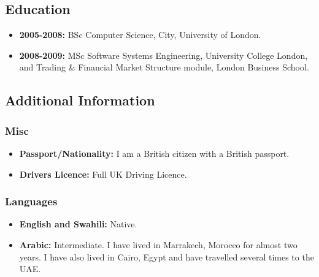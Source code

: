 \documentclass[
  a4paper,
]{article}
\providecommand{\tightlist}{%
  \setlength{\itemsep}{0pt}\setlength{\parskip}{0pt}}
\begin{document}
\hypertarget{education}{%
\subsection{Education}\label{education}}

\begin{itemize}
\tightlist
\item
  \textbf{2005-2008:} BSc Computer Science, City, University of London.
\item
  \textbf{2008-2009:} MSc Software Systems Engineering, University
  College London, and Trading \& Financial Market Structure module,
  London Business School.
\end{itemize}

\hypertarget{additional-information}{%
\subsection{Additional Information}\label{additional-information}}

\hypertarget{misc}{%
\subsubsection{Misc}\label{misc}}

\begin{itemize}
\tightlist
\item
  \textbf{Passport/Nationality:} I am a British citizen with a British
  passport.
\item
  \textbf{Drivers Licence:} Full UK Driving Licence.
\end{itemize}

\hypertarget{languages}{%
\subsubsection{Languages}\label{languages}}

\begin{itemize}
\tightlist
\item
  \textbf{English and Swahili:} Native.
\item
  \textbf{Arabic:} Intermediate. I have lived in Marrakech, Morocco for
  almost two years. I have also lived in Cairo, Egypt and have travelled
  several times to the UAE.
\end{itemize}
\end{document}
